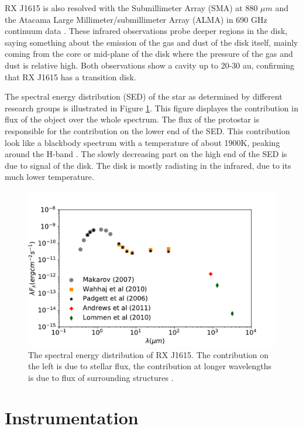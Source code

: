 \documentclass[twoside,single]{lion-msc}
\begin{document}
RX J1615 is also resolved with the Submillimeter Array (SMA) at 880 $\mu m$ \citep{Andrews2011} and the  Atacama Large Millimeter/submillimeter Array (ALMA) in 690 GHz continuum data \citep{VanderMarel2015}. These infrared observations probe deeper regions in the disk, saying something about the emission of the gas and dust of the disk itself, mainly coming from the core or mid-plane of the disk where the pressure of the gas and dust is relative high. Both observations show a cavity up to 20-30 au, confirming that RX J1615 has a transition disk. 
\bigskip

The spectral energy distribution (SED) of the star as determined by different research groups is illustrated in Figure \ref{fig:SED}. This figure displayes the contribution in flux of the object over the whole spectrum. The flux of the protostar is responsible for the contribution on the lower end of the SED. This contribution look like a blackbody spectrum with a temperature of about 1900K, peaking around the H-band \citep{Padgett2008}. The slowly decreasing part on the high end of the SED is due to signal of the disk. The disk is mostly radiating in the infrared, due to its much lower temperature.

\begin{figure}[htb]
\centering
\includegraphics[width = \textwidth]{SEDnew.pdf}
\caption{The spectral energy distribution of RX J1615. The contribution on the left is due to stellar flux, the contribution at longer wavelengths is due to flux of surrounding structures \cite{Makarov2007}\cite{Wahhaj2010}\citep{Padgett2008}\citep{Andrews2011}\citep{Lommen2010}.}
\label{fig:SED}
\end{figure}

\chapter{Instrumentation}
\end{document}
